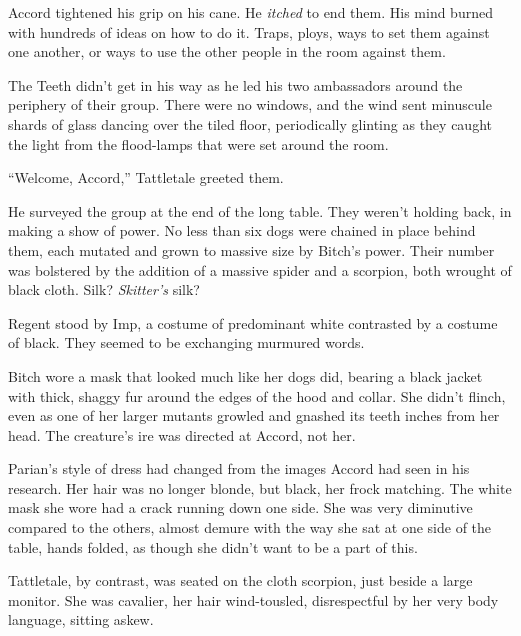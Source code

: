 Accord tightened his grip on his cane.  He \emph{itched} to end them.  His mind burned with hundreds of ideas on how to do it.  Traps, ploys, ways to set them against one another, or ways to use the other people in the room against them.



The Teeth didn't get in his way as he led his two ambassadors around the periphery of their group.  There were no windows, and the wind sent minuscule shards of glass dancing over the tiled floor, periodically glinting as they caught the light from the flood-lamps that were set around the room.



``Welcome, Accord,'' Tattletale greeted them.



He surveyed the group at the end of the long table.  They weren't holding back, in making a show of power.  No less than six dogs were chained in place behind them, each mutated and grown to massive size by Bitch's power.  Their number was bolstered by the addition of a massive spider and a scorpion, both wrought of black cloth.  Silk?  \emph{Skitter's} silk?



Regent stood by Imp, a costume of predominant white contrasted by a costume of black.  They seemed to be exchanging murmured words.



Bitch wore a mask that looked much like her dogs did, bearing a black jacket with thick, shaggy fur around the edges of the hood and collar.  She didn't flinch, even as one of her larger mutants growled and gnashed its teeth inches from her head.  The creature's ire was directed at Accord, not her.



Parian's style of dress had changed from the images Accord had seen in his research.  Her hair was no longer blonde, but black, her frock matching.  The white mask she wore had a crack running down one side.  She was very diminutive compared to the others, almost demure with the way she sat at one side of the table, hands folded, as though she didn't want to be a part of this.



Tattletale, by contrast, was seated on the cloth scorpion, just beside a large monitor.  She was cavalier, her hair wind-tousled, disrespectful by her very body language, sitting askew.



